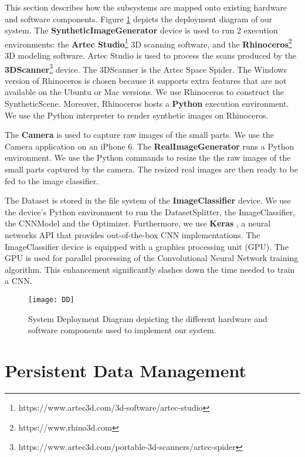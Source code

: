 This section describes how the subsystems are mapped onto existing hardware and software components. Figure \ref{fig:DD} depicts the deployment diagram of our system. The \textbf{SyntheticImageGenerator} device is used to run 2 execution environments: the \textbf{Artec Studio}\footnote{https://www.artec3d.com/3d-software/artec-studio} 3D scanning software, and the \textbf{Rhinoceros}\footnote{https://www.rhino3d.com} 3D modeling software. Artec Studio is used to process the scans produced by the \textbf{3DScanner}\footnote{https://www.artec3d.com/portable-3d-scanners/artec-spider} device. The 3DScanner is the Artec Space Spider. The Windows version of Rhinoceros is chosen because it supports extra features that are not available on the Ubuntu or Mac versions. We use Rhinoceros to construct the SyntheticScene. Moreover, Rhinoceros hosts a \textbf{Python} execution environment. We use the Python interpreter to render synthetic images on Rhinoceros.

The \textbf{Camera} is used to capture raw images of the small parts. We use the Camera application on an iPhone 6. The \textbf{RealImageGenerator} runs a Python environment. We use the Python commands to resize the the raw images of the small parts captured by the camera. The resized real images are then ready to be fed to the image classifier.

The Dataset is stored in the file system of the \textbf{ImageClassifier} device. We use the device's Python environment to run the DatasetSplitter, the ImageClassifier, the CNNModel and the Optimizer. Furthermore, we use \textbf{Keras} \cite{chollet2015keras}, a neural networks API that provides out-of-the-box CNN implementations. The ImageClassifier device is equipped with a graphics processing unit (GPU). The GPU is used for parallel processing of the Convolutional Neural Network training algorithm. This enhancement significantly slashes down the time needed to train a CNN.

\begin{figure}[h]
\centering
  \texttt{[image: DD]}
\caption{System Deployment Diagram depicting the different hardware and software components used to implement our system.}
\label{fig:DD}
\end{figure}

\section{Persistent Data Management}\label{sec:persistent_data_management}

